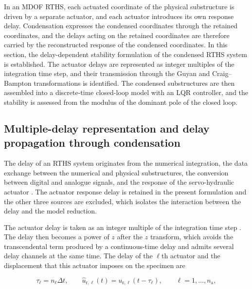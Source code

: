 \documentclass[a4paper,fleqn,review,12pt]{cas-sc}
\numberwithin{equation}{section}
\begin{document}
In an MDOF RTHS, each actuated coordinate of the physical substructure is driven by a separate actuator, and each actuator introduces its own response delay. Condensation expresses the condensed coordinates through the retained coordinates, and the delays acting on the retained coordinates are therefore carried by the reconstructed response of the condensed coordinates. In this section, the delay-dependent stability formulation of the condensed RTHS system is established. The actuator delays are represented as integer multiples of the integration time step, and their transmission through the Guyan and Craig--Bampton transformations is identified. The condensed substructures are then assembled into a discrete-time closed-loop model with an LQR controller, and the stability is assessed from the modulus of the dominant pole of the closed loop.

\subsection{Multiple-delay representation and delay propagation through condensation}
\label{sec:multiple-delay}

The delay of an RTHS system originates from the numerical integration, the data exchange between the numerical and physical substructures, the conversion between digital and analogue signals, and the response of the servo-hydraulic actuator \cite{Carrion2007}. The actuator response delay is retained in the present formulation and the other three sources are excluded, which isolates the interaction between the delay and the model reduction.

The actuator delay is taken as an integer multiple of the integration time step \cite{Zhu2015}. The delay then becomes a power of \(z\) after the \(z\) transform, which avoids the transcendental term produced by a continuous-time delay and admits several delay channels at the same time. The delay of the \(\ell\)th actuator and the displacement that this actuator imposes on the specimen are

\vspace{-3.5em}
\begin{equation}
	\tau_{\ell}=n_{\ell}\Delta t,
	\qquad
	\hat{u}_{\mathrm{r},\ell}(t)=u_{\mathrm{r},\ell}(t-\tau_{\ell}),
	\qquad
	\ell=1,\dots,n_{\mathrm{a}},
	\label{eq:integer-delay}
\end{equation}
\vspace{-3.5em}
\end{document}
